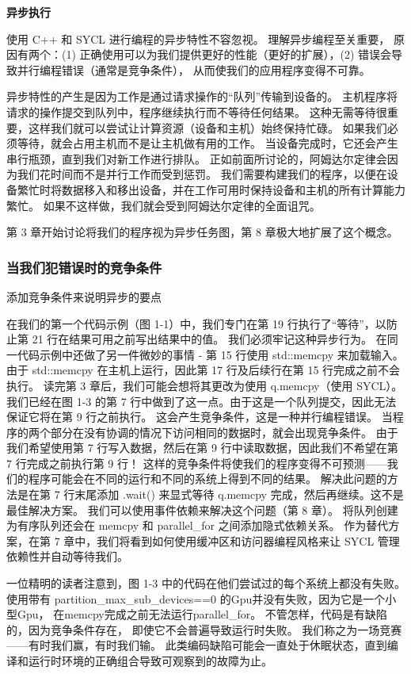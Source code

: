 \textbf{异步执行}

使用 C++ 和 SYCL 进行编程的异步特性不容忽视。 理解异步编程至关重要，
原因有两个：(1) 正确使用可以为我们提供更好的性能（更好的扩展），(2) 错误会导致并行编程错误（通常是竞争条件），
从而使我们的应用程序变得不可靠。

异步特性的产生是因为工作是通过请求操作的“队列”传输到设备的。 
主机程序将请求的操作提交到队列中，程序继续执行而不等待任何结果。 
这种无需等待很重要，这样我们就可以尝试让计算资源（设备和主机）始终保持忙碌。 
如果我们必须等待，就会占用主机而不是让主机做有用的工作。 当设备完成时，它还会产生串行瓶颈，直到我们对新工作进行排队。 
正如前面所讨论的，阿姆达尔定律会因为我们花时间而不是并行工作而受到惩罚。 
我们需要构建我们的程序，以便在设备繁忙时将数据移入和移出设备，并在工作可用时保持设备和主机的所有计算能力繁忙。 
如果不这样做，我们就会受到阿姆达尔定律的全面诅咒。

第 3 章开始讨论将我们的程序视为异步任务图，第 8 章极大地扩展了这个概念。

\subsubsection{当我们犯错误时的竞争条件}
{\color{red} 添加竞争条件来说明异步的要点}

在我们的第一个代码示例（图 1-1）中，我们专门在第 19 行执行了“等待”，以防止第 21 行在结果可用之前写出结果中的值。 
我们必须牢记这种异步行为。 在同一代码示例中还做了另一件微妙的事情 - 第 15 行使用 std::memcpy 来加载输入。 
由于 std::memcpy 在主机上运行，因此第 17 行及后续行在第 15 行完成之前不会执行。 
读完第 3 章后，我们可能会想将其更改为使用 q.memcpy（使用 SYCL）。 
我们已经在图 1-3 的第 7 行中做到了这一点。由于这是一个队列提交，因此无法保证它将在第 9 行之前执行。
这会产生竞争条件，这是一种并行编程错误。 当程序的两个部分在没有协调的情况下访问相同的数据时，就会出现竞争条件。 
由于我们希望使用第 7 行写入数据，然后在第 9 行中读取数据，因此我们不希望在第 7 行完成之前执行第 9 行！ 
这样的竞争条件将使我们的程序变得不可预测——我们的程序可能会在不同的运行和不同的系统上得到不同的结果。 
解决此问题的方法是在第 7 行末尾添加 .wait() 来显式等待 q.memcpy 完成，然后再继续。这不是最佳解决方案。 
我们可以使用事件依赖来解决这个问题（第 8 章）。 
将队列创建为有序队列还会在 memcpy 和 parallel\_for 之间添加隐式依赖关系。 
作为替代方案，在第 7 章中，我们将看到如何使用缓冲区和访问器编程风格来让 SYCL 管理依赖性并自动等待我们。

\begin{remark}[竞争条件并不总是导致程序失败]
	一位精明的读者注意到，图 1-3 中的代码在他们尝试过的每个系统上都没有失败。 
	使用带有 partition\_max\_sub\_devices==0 的Gpu并没有失败，因为它是一个小型Gpu，
	在memcpy完成之前无法运行parallel\_for。 不管怎样，代码是有缺陷的，因为竞争条件存在，
	即使它不会普遍导致运行时失败。 我们称之为一场竞赛——有时我们赢，有时我们输。 
	此类编码缺陷可能会一直处于休眠状态，直到编译和运行时环境的正确组合导致可观察到的故障为止。
\end{remark}

